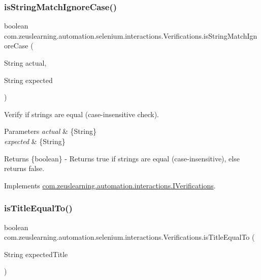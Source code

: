 \subsubsection{\texorpdfstring{is\+String\+Match\+Ignore\+Case()}{isStringMatchIgnoreCase()}}
{\footnotesize\ttfamily boolean com.\+zeuslearning.\+automation.\+selenium.\+interactions.\+Verifications.\+is\+String\+Match\+Ignore\+Case (\begin{DoxyParamCaption}\item[{String}]{actual,  }\item[{String}]{expected }\end{DoxyParamCaption})\hspace{0.3cm}{\ttfamily [inline]}}

Verify if strings are equal (case-\/insensitive check).


\begin{DoxyParams}{Parameters}
{\em actual} & \{String\} \\
\hline
{\em expected} & \{String\} \\
\hline
\end{DoxyParams}
\begin{DoxyReturn}{Returns}
\{boolean\} -\/ Returns {\ttfamily true} if strings are equal (case-\/insensitive), else returns {\ttfamily false}. 
\end{DoxyReturn}


Implements \hyperlink{interfacecom_1_1zeuslearning_1_1automation_1_1interactions_1_1IVerifications_a9ff9d7c332e151b80a80396d264d1cd5}{com.\+zeuslearning.\+automation.\+interactions.\+I\+Verifications}.

\hypertarget{classcom_1_1zeuslearning_1_1automation_1_1selenium_1_1interactions_1_1Verifications_ad9c55fe144291c194e182b1b2b213da5}{}\label{classcom_1_1zeuslearning_1_1automation_1_1selenium_1_1interactions_1_1Verifications_ad9c55fe144291c194e182b1b2b213da5} 
\subsubsection{\texorpdfstring{is\+Title\+Equal\+To()}{isTitleEqualTo()}}
{\footnotesize\ttfamily boolean com.\+zeuslearning.\+automation.\+selenium.\+interactions.\+Verifications.\+is\+Title\+Equal\+To (\begin{DoxyParamCaption}\item[{String}]{expected\+Title }\end{DoxyParamCaption})\hspace{0.3cm}{\ttfamily [inline]}}

